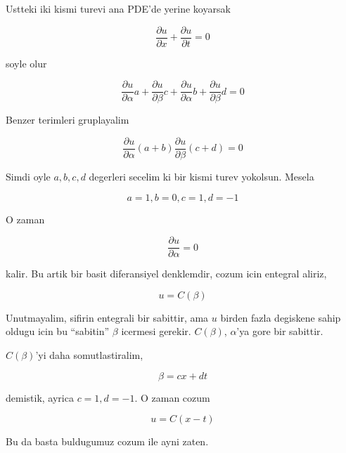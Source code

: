 \documentclass[12pt,fleqn]{article}
\begin{document}
Ustteki iki kismi turevi ana PDE'de yerine koyarsak

\[ \frac{\partial u}{\partial x} + \frac{\partial u}{\partial t} = 0\]

soyle olur

\[ 
\frac{\partial u}{\partial \alpha} a  +
\frac{\partial u}{\partial \beta} c + 
\frac{\partial u}{\partial \alpha} b + 
\frac{\partial u}{\partial \beta} d = 0
\]

Benzer terimleri gruplayalim

\[ 
\frac{\partial u}{\partial \alpha} (a+b)
\frac{\partial u}{\partial \beta} (c+d) = 0
\]

Simdi oyle $a,b,c,d$ degerleri secelim ki bir kismi turev yokolsun. Mesela 

\[ a = 1, b = 0, c=1, d=-1 \]


O zaman 

\[ \frac{\partial u}{\partial \alpha} = 0 \]

kalir. Bu artik bir basit diferansiyel denklemdir, cozum icin entegral
aliriz, 

\[ u = C(\beta) \]

Unutmayalim, sifirin entegrali bir sabittir, ama $u$ birden fazla degiskene
sahip oldugu icin bu ``sabitin'' $\beta$ icermesi gerekir. $C(\beta)$,
$\alpha$'ya gore bir sabittir. 

$C(\beta)$'yi daha somutlastiralim, 

\[ \beta = cx + dt \]
 
demistik, ayrica $c=1,d=-1$. O zaman cozum

\[ u = C(x-t) \]

Bu da basta buldugumuz cozum ile ayni zaten. 
\end{document}
